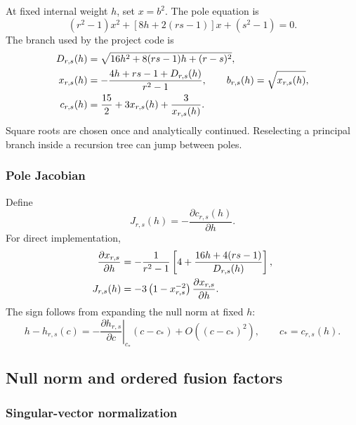 \documentclass[11pt]{article}
\begin{document}
At fixed internal weight \(h\), set \(x=b^2\).  The pole equation is
\begin{equation}
 (r^2-1)x^2+[8h+2(rs-1)]x+(s^2-1)=0.
 \label{eq:pole-quadratic}
\end{equation}
The branch used by the project code is
\begin{align}
 D_{r,s}(h)
 &=\sqrt{16h^2+8(rs-1)h+(r-s)^2},
 \notag\\
 x_{r,s}(h)
 &=-\frac{4h+rs-1+D_{r,s}(h)}{r^2-1},
 \qquad
 b_{r,s}(h)=\sqrt{x_{r,s}(h)},
 \label{eq:pole-x}\\
 c_{r,s}(h)
 &=\frac{15}{2}+3x_{r,s}(h)+\frac{3}{x_{r,s}(h)}.
 \label{eq:c-pole}
\end{align}
Square roots are chosen once and analytically continued.  Reselecting a
principal branch inside a recursion tree can jump between poles.

\subsubsection{Pole Jacobian}

Define
\begin{equation}
 J_{r,s}(h)=-\frac{\partial c_{r,s}(h)}{\partial h}.
 \label{eq:jacobian-definition}
\end{equation}
For direct implementation,
\begin{align}
 \frac{\partial x_{r,s}}{\partial h}
 &=-\frac{1}{r^2-1}
 \left[4+\frac{16h+4(rs-1)}{D_{r,s}(h)}\right],
 \notag\\
 J_{r,s}(h)
 &=-3\left(1-x_{r,s}^{-2}\right)
 \frac{\partial x_{r,s}}{\partial h}.
 \label{eq:jacobian-explicit}
\end{align}
The sign follows from expanding the null norm at fixed \(h\):
\begin{equation}
 h-h_{r,s}(c)
 =-\left.\frac{\partial h_{r,s}}{\partial c}\right|_{c_*}
   (c-c_*)+O((c-c_*)^2),
 \qquad c_*=c_{r,s}(h).
 \label{eq:jacobian-sign}
\end{equation}

\subsection{Null norm and ordered fusion factors}
\label{sec:null-fusion}

\subsubsection{Singular-vector normalization}
\end{document}
